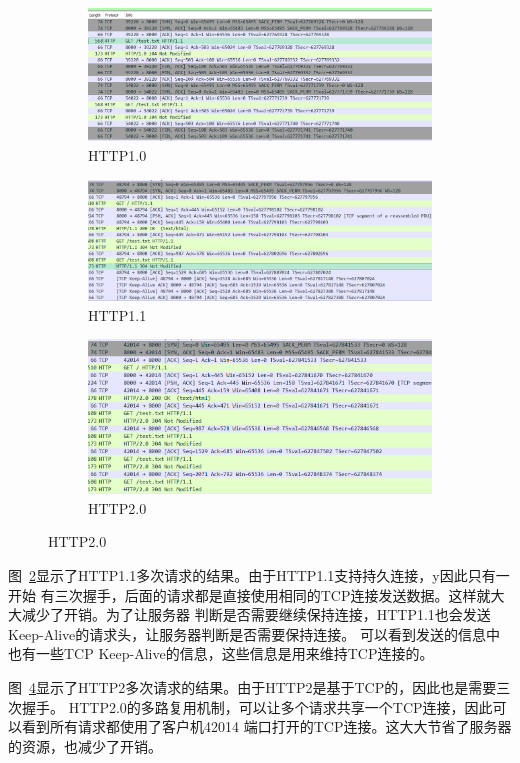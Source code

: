 \documentclass[a4paper,twoside]{article}
\begin{document}
\begin{spacing}{1.2}
\begin{figure}[H]
	\centering
	\caption{不同版本的HTTP}
	\label{fig:http}
	\begin{subfigure}{0.4\textwidth}
		\centering
		\includegraphics[width=\textwidth]{http10.png}
		\caption{HTTP1.0}
		\label{fig:http10}
	\end{subfigure}
	\begin{subfigure}{0.4\textwidth}
		\centering
		\includegraphics[width=\textwidth]{http11.png}
		\caption{HTTP1.1}
		\label{fig:http11}
	\end{subfigure}
	\begin{subfigure}{0.4\textwidth}
		\centering
		\includegraphics[width=\textwidth]{http20.png}
		\caption{HTTP2.0}
		\label{fig:http20}
	\end{subfigure}
\end{figure}

图~\ref{fig:http11}显示了HTTP1.1多次请求的结果。由于HTTP1.1支持持久连接，y因此只有一开始
有三次握手，后面的请求都是直接使用相同的TCP连接发送数据。这样就大大减少了开销。为了让服务器
判断是否需要继续保持连接，HTTP1.1也会发送Keep-Alive的请求头，让服务器判断是否需要保持连接。
可以看到发送的信息中也有一些TCP Keep-Alive的信息，这些信息是用来维持TCP连接的。

图~\ref{fig:http20}显示了HTTP2多次请求的结果。由于HTTP2是基于TCP的，因此也是需要三次握手。
HTTP2.0的多路复用机制，可以让多个请求共享一个TCP连接，因此可以看到所有请求都使用了客户机42014
端口打开的TCP连接。这大大节省了服务器的资源，也减少了开销。

\end{spacing}
\end{document}
